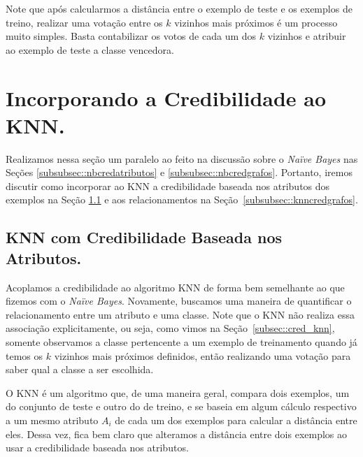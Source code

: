 Note que após calcularmos a distância entre o exemplo de teste e os exemplos de treino, realizar uma votação entre os $k$ vizinhos mais próximos é um processo muito simples. Basta contabilizar os votos de cada um dos $k$ vizinhos e atribuir ao exemplo de teste a classe vencedora.

\section{Incorporando a Credibilidade ao \textsc{KNN}.}
\label{subsubsec::knn_cred}

Realizamos nessa seção um paralelo ao feito na discussão sobre o \textit{Naïve Bayes} nas Seções \ref{subsubsec::nbcredatributos} e \ref{subsubsec::nbcredgrafos}. Portanto, iremos discutir como incorporar ao \textsc{KNN} a credibilidade baseada nos atributos dos exemplos na Seção \ref{subsubsec::knncredatributos} e aos relacionamentos na Seção~\ref{subsubsec::knncredgrafos}.

\subsection{\textsc{KNN} com Credibilidade Baseada nos Atributos.}
\label{subsubsec::knncredatributos}


Acoplamos a credibilidade ao algoritmo \textsc{KNN} de forma bem semelhante ao que fizemos com o \textit{Naïve Bayes}. 
Novamente, buscamos uma maneira de quantificar o relacionamento entre um atributo e uma classe. 
Note que o \textsc{KNN} não realiza essa associação explicitamente, ou seja, como vimos na Seção~\ref{subsec::cred_knn}, somente observamos a classe pertencente a um exemplo de treinamento quando já temos os $k$ vizinhos mais próximos definidos, então realizando uma votação para saber qual a classe a ser escolhida.

O \textsc{KNN} é um algoritmo que, de uma maneira geral, compara dois exemplos, um do conjunto de teste e outro do de treino, e se baseia em algum cálculo respectivo a um mesmo atributo $A_i$ de cada um dos exemplos para calcular a distância entre eles. Dessa vez, fica bem claro que alteramos a distância entre dois exemplos ao usar a credibilidade baseada nos atributos. 


